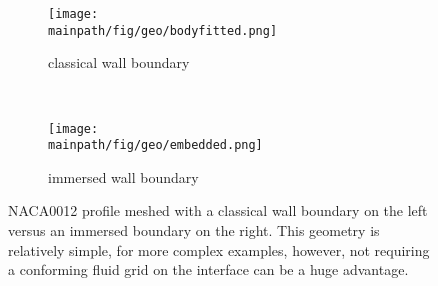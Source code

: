 \documentclass[../main.tex]{subfiles}
\begin{document}
\begin{figure}
\centering
			    \begin{subfigure}[t]{0.4\textwidth}
			        \centering
			        \texttt{[image: \\mainpath/fig/geo/bodyfitted.png]}
			        \caption{classical wall boundary}
			    \end{subfigure}~
			    	\begin{subfigure}[t]{0.4\textwidth}
			        \centering
			        \texttt{[image: \\mainpath/fig/geo/embedded.png]}
			        \caption{immersed wall boundary}
			    \end{subfigure}%
\caption[Body-fitted vs. immersed wall boundary]{NACA0012 profile meshed with a classical wall boundary on the left versus an immersed boundary on the right. This geometry is relatively simple, for more complex examples, however, not requiring a conforming fluid grid on the interface can be a huge advantage.}
\label{fig:ale_vs_embedded}
\end{figure}
\end{document}
